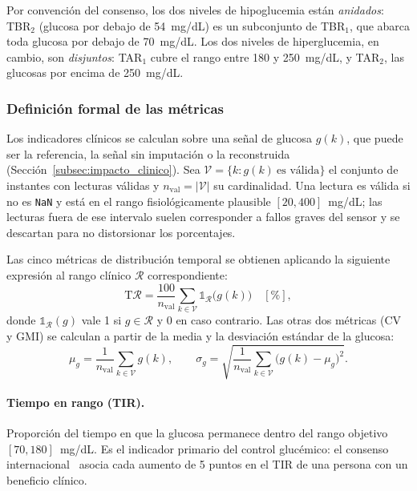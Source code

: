 \documentclass{report}
\begin{document}
Por convención del consenso, los dos niveles de hipoglucemia están \textit{anidados}: TBR$_2$ (glucosa por debajo de 54~mg/dL) es un subconjunto de TBR$_1$, que abarca toda glucosa por debajo de 70~mg/dL. Los dos niveles de hiperglucemia, en cambio, son \textit{disjuntos}: TAR$_1$ cubre el rango entre 180 y 250~mg/dL, y TAR$_2$, las glucosas por encima de 250~mg/dL.

\subsubsection{Definición formal de las métricas}

Los indicadores clínicos se calculan sobre una señal de glucosa $g(k)$, que puede ser la referencia, la señal sin imputación o la reconstruida (Sección~\ref{subsec:impacto_clinico}). Sea $\mathcal{V} = \{k : g(k)\ \text{es válida}\}$ el conjunto de instantes con lecturas válidas y $n_{\mathrm{val}} = |\mathcal{V}|$ su cardinalidad. Una lectura es válida si no es \texttt{NaN} y está en el rango fisiológicamente plausible $[20, 400]$~mg/dL; las lecturas fuera de ese intervalo suelen corresponder a fallos graves del sensor y se descartan para no distorsionar los porcentajes.

Las cinco métricas de distribución temporal se obtienen aplicando la siguiente expresión al rango clínico $\mathcal{R}$ correspondiente:
\begin{equation}
\label{eq:tir_general}
\mathrm{T\mathcal{R}} = \frac{100}{n_{\mathrm{val}}} \sum_{k \in \mathcal{V}} \mathbb{1}_{\mathcal{R}}\big(g(k)\big) \quad [\%],
\end{equation}
donde $\mathbb{1}_{\mathcal{R}}(g)$ vale 1 si $g \in \mathcal{R}$ y 0 en caso contrario. Las otras dos métricas (CV y GMI) se calculan a partir de la media y la desviación estándar de la glucosa:
\begin{equation}
\label{eq:mean_sd}
\mu_g = \frac{1}{n_{\mathrm{val}}} \sum_{k \in \mathcal{V}} g(k), 
\qquad
\sigma_g = \sqrt{\frac{1}{n_{\mathrm{val}}} \sum_{k \in \mathcal{V}} \big(g(k) - \mu_g\big)^{2}}.
\end{equation}

\paragraph{Tiempo en rango (TIR).} Proporción del tiempo en que la glucosa permanece dentro del rango objetivo $[70, 180]$~mg/dL. Es el indicador primario del control glucémico: el consenso internacional~\cite{battelino2019} asocia cada aumento de 5 puntos en el TIR de una persona con un beneficio clínico.
\end{document}
